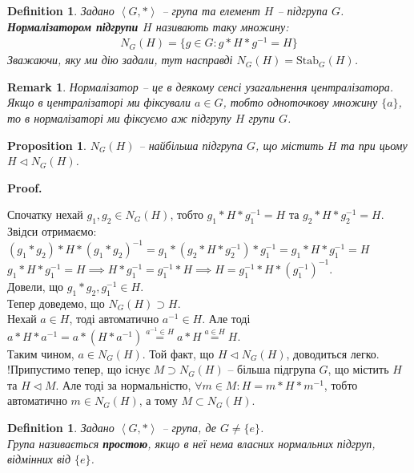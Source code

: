 \documentclass[a4paper, 10pt]{article}
\makeatletter
\theoremstyle{theoremdd}
\theoremstyle{theoremdd}
\newtheorem{definition}[theorem]{Definition}
\theoremstyle{theoremdd}
\theoremstyle{theoremdd}
\theoremstyle{theoremdd}
\theoremstyle{theoremdd}
\theoremstyle{theoremdd}
\theoremstyle{theoremdd}
\theoremstyle{theoremdd}
\newtheorem{proposition}[theorem]{Proposition}
\theoremstyle{theoremdd}
\theoremstyle{theoremdd}
\newtheorem{remark}[theorem]{Remark}
\theoremstyle{theoremdd}
\theoremstyle{theoremdd}
\theoremstyle{theoremdd}
\theoremstyle{theoremdd}
\renewenvironment{proof}[1][Proof.\\]{\par
\pushQED{\hfill \qed}%
\normalfont \topsep6\p@\@plus6\p@\relax
\trivlist
\item\relax
{\bfseries
#1\@addpunct{.}}\hspace\labelsep\ignorespaces
}{%
\popQED\endtrivlist\@endpefalse
}
\newcommand\Stab{\text{Stab}}
\makeatother
\begin{document}
\begin{definition}
Задано $\left< G, *\right>$ -- група та елемент $H$ -- підгрупа $G$.\\
\textbf{Нормалізатором підгрупи $H$} називають таку множину:
\begin{align*}
N_G(H) = \{g \in G: g*H*g^{-1} = H\}
\end{align*}
Зважаючи, яку ми дію задали, тут насправді $N_G(H) = \Stab_G(H)$.
\end{definition}

\begin{remark}
Нормалізатор -- це в деякому сенсі узагальнення централізатора. Якщо в централізаторі ми фіксували $a \in G$, тобто одноточкову множину $\{a\}$, то в нормалізаторі ми фіксуємо аж підгрупу $H$ групи $G$.
\end{remark}

\begin{proposition}
$N_G(H)$ -- найбільша підгрупа $G$, що містить $H$ та при цьому $H \triangleleft N_G(H)$.
\end{proposition}

\begin{proof}
Спочатку нехай $g_1,g_2 \in N_G(H)$, тобто $g_1*H*g_1^{-1} = H$ та $g_2*H*g_2^{-1} = H$. Звідси отримаємо:\\
$(g_1*g_2)*H*(g_1*g_2)^{-1} = g_1*(g_2*H*g_2^{-1})*g_1^{-1} = g_1*H*g_1^{-1} = H$\\
$g_1*H*g_1^{-1} = H \implies H*g_1^{-1} = g_1^{-1}*H \implies H = g_1^{-1}*H*(g_1^{-1})^{-1}$.\\
Довели, що $g_1*g_2, g_1^{-1} \in H$.\\
Тепер доведемо, що $N_G(H) \supset H$.\\
Нехай $a \in H$, тоді автоматично $a^{-1} \in H$. Але тоді\\
$a*H*a^{-1} = a*(H*a^{-1}) \overset{a^{-1} \in H}{=} a*H \overset{a \in H}{=} H$.\\
Таким чином, $a \in N_G(H)$. Той факт, що $H \triangleleft N_G(H)$, доводиться легко.\\
!Припустимо тепер, що існує $M \supset N_G(H)$ -- більша підгрупа $G$, що містить $H$ та $H \triangleleft M$. Але тоді за нормальністю, $\forall m \in M: H = m*H*m^{-1}$, тобто автоматично $m \in N_G(H)$, а тому $M \subset N_G(H)$.
\end{proof}

\begin{definition}
Задано $\left< G, *\right>$ -- група, де $G \neq \{e\}$.\\
Група називається \textbf{простою}, якщо в неї нема власних нормальних підгруп, відмінних від $\{e\}$.
\end{definition}
\end{document}
